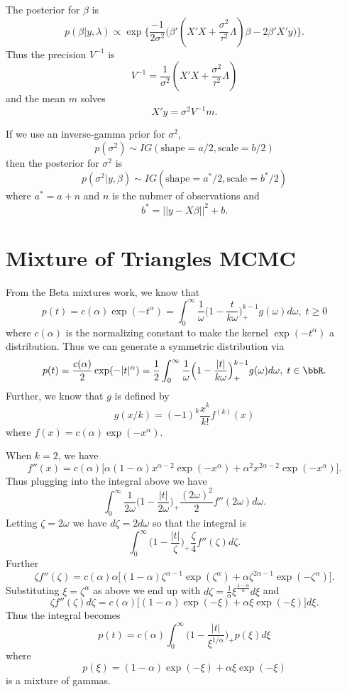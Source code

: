 \documentclass{article}
\begin{document}
The posterior for $\beta$ is
\[
p(\beta | y, \lambda) \propto
\exp \Big\{ \frac{-1}{2 \sigma^2} \Big( \beta' (X'X + \frac{\sigma^2}{\tau^2}
\Lambda) \beta - 2 \beta' X' y \Big) \Big\}.
\]
Thus the precision $V^{-1}$ is
\[
V^{-1} = \frac{1}{\sigma^2} (X'X + \frac{\sigma^2}{\tau^2} \Lambda)
\]
and the mean $m$ solves
\[
X'y = \sigma^2 V^{-1} m.
\]

If we use an inverse-gamma prior for $\sigma^2$,
\[
p(\sigma^2) \sim IG(\text{shape}=a/2, \text{scale}=b/2)
\]
then the posterior for $\sigma^2$ is
\[
p(\sigma^2 | y, \beta) \sim IG(\text{shape}=a^*/2, \text{scale}=b^*/2)
\]
where $a^* = a + n$ and $n$ is the nubmer of observations and
\[
b^* = ||y - X \beta||^2 + b.
\]

\section{Mixture of Triangles MCMC}

From the Beta mixtures work, we know that
\[
p(t) = c(\alpha) \exp(-t^\alpha) = \int_0^\infty \frac{1}{\omega} \Big(1 - \frac{t}{k
  \omega}\Big)_+^{k-1} g(\omega) d\omega, \; t \geq 0
\]
where $c(\alpha)$ is the normalizing constant to make the kernel
$\exp(-t^\alpha)$ a distribution.  Thus we can generate a symmetric distribution
via
\[
p(t) = \frac{c(\alpha)}{2} \exp(-|t|^\alpha) 
= \frac{1}{2} \int_0^\infty \frac{1}{\omega} \Big(1 - \frac{|t|}{k
  \omega}\Big)_+^{k-1} g(\omega) d\omega, \; t \in \bbR.
\]
Further, we know that $g$ is defined by
\[
g(x/k) = (-1)^k \frac{x^k}{k!} f^{(k)}(x)
\]
where $f(x) = c(\alpha) \exp(-x^\alpha)$.

When $k=2$, we have 
\[
f''(x) = c(\alpha) \Big[ \alpha (1 - \alpha) x^{\alpha-2} \exp (-x^\alpha) + \alpha^2
x^{2\alpha - 2} \exp(-x^\alpha) \Big].
\]
Thus plugging into the integral above we have
\[
\int_0^\infty \frac{1}{2\omega} \Big(1 - \frac{|t|}{2 \omega}\Big)_+
\frac{(2\omega)^2}{2} f''(2 \omega) d\omega.
\]
Letting $\zeta = 2 \omega$ we have $d \zeta = 2 d \omega$ so that the integral
is
\[
\int_0^\infty \Big(1 - \frac{|t|}{\zeta}\Big)_+ \frac{\zeta}{4} f''(\zeta) d\zeta.
\]
Further
\[
\zeta f''(\zeta) = c(\alpha) \alpha \Big[ (1-\alpha) \zeta^{\alpha - 1}
\exp(\zeta^\alpha) + \alpha \zeta^{2 \alpha - 1} \exp(-\zeta^\alpha) \Big].
\]
Substituting $\xi = \zeta^\alpha$ as above we end up with $d \zeta =
\frac{1}{\alpha} \xi^{\frac{1-\alpha}{\alpha}} d \xi$ and
\[
\zeta f''(\zeta) d \zeta = c(\alpha) \Big[ (1-\alpha) \exp(-\xi) + \alpha \xi
\exp(-\xi) \Big] d \xi.
\]
Thus the integral becomes
\[
p(t) =  c(\alpha) \int_0^\infty \Big( 1 - \frac{|t|}{\xi^{1/\alpha}} \Big)_+
p(\xi) d \xi
\]
where
\[
p(\xi) = (1-\alpha) \exp(-\xi) + \alpha \xi \exp(-\xi)
\]
is a mixture of gammas.
\end{document}
